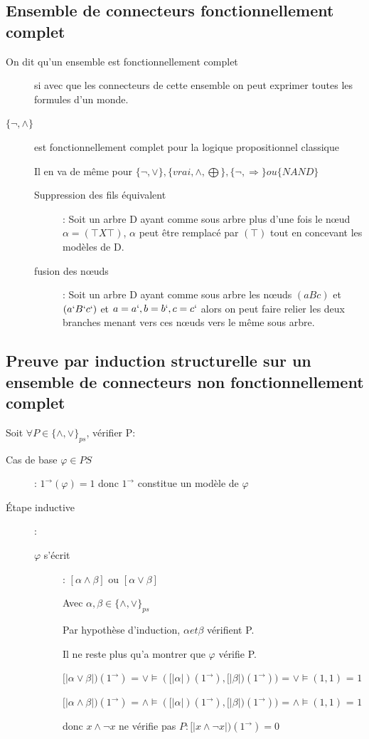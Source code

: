 \subsection{Ensemble de connecteurs fonctionnellement complet}
\begin{description}
\item[On dit qu'un ensemble est fonctionnellement complet] si avec que les connecteurs de cette ensemble on peut exprimer toutes les formules d'un monde.
\item[$\{\neg, \wedge\}$] est fonctionnellement complet pour la logique propositionnel classique
\item[] Il en va de même pour $\{\neg, \vee\}, \{vrai, \wedge, \bigoplus\}, \{\neg, \Rightarrow\} ou \{NAND\}$

\begin{description}
\item[Suppression des fils équivalent]: Soit un arbre D ayant comme sous arbre plus d'une fois le nœud $\alpha = (\top X \top)$, $\alpha$ peut être remplacé par $(\top)$ tout en concevant les modèles de D.
\item[fusion des nœuds]: Soit un arbre D ayant comme sous arbre les nœuds $(a B c)$ et $(a` B` c`)$ et $a = a`, b = b`, c = c`$ alors on peut faire relier les deux branches menant vers ces nœuds vers le même sous arbre.
\end{description}
\end{description}

\subsection{Preuve par induction structurelle sur un ensemble de connecteurs non fonctionnellement complet}

Soit $ \forall P \in \{ \wedge, \vee \}_{ps}$, vérifier P:
\begin{description}
\item[Cas de base $\varphi \in PS$]: $1^\rightarrow (\varphi) = 1$ donc $1^\rightarrow$ constitue un modèle de $\varphi$
\item[Étape inductive]: 
\begin{description}
\item[$\varphi$ s'écrit]: $[\alpha \wedge \beta]$ ou $[\alpha \vee \beta]$
\item[] Avec $\alpha, \beta \in \{ \wedge, \vee \}_{ps}$
\item[] Par hypothèse d'induction, $\alpha et \beta$ vérifient P.
\item[] Il ne reste plus qu'a montrer que $\varphi$ vérifie P.
\item[] $[| \alpha \vee \beta |)(1^\rightarrow)$ = $\vee \models ([|\alpha |)(1^\rightarrow), [|\beta |)(1^\rightarrow))$ = $\vee \models (1,1)$ = $1$
\item[] $[| \alpha \wedge \beta |)(1^\rightarrow)$ = $\wedge \models ([|\alpha |)(1^\rightarrow), [|\beta |)(1^\rightarrow))$ = $\wedge \models (1,1)$ = $1$
\item[] donc $x \wedge \neg x$ ne vérifie pas  $P: [| x \wedge \neg x|)(1^\rightarrow) = 0$
\end{description}
\end{description}

